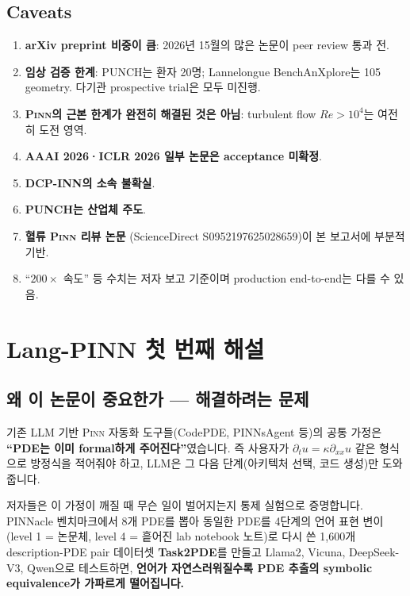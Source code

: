 \documentclass[11pt,a4paper,oneside]{report}
\newcommand{\pinn}{\textsc{Pinn}}
\begin{document}
\section{Caveats}

\begin{warningbox}
\begin{enumerate}
\item \textbf{arXiv preprint 비중이 큼}: 2026년 1\textendash 5월의 많은 논문이 peer review 통과 전.
\item \textbf{임상 검증 한계}: PUNCH는 환자 20명; Lannelongue BenchAnXplore는 105 geometry. 다기관 prospective trial은 모두 미진행.
\item \textbf{\pinn{}의 근본 한계가 완전히 해결된 것은 아님}: turbulent flow $Re > 10^4$는 여전히 도전 영역.
\item \textbf{AAAI 2026·ICLR 2026 일부 논문은 acceptance 미확정}.
\item \textbf{DCP-INN의 소속 불확실}.
\item \textbf{PUNCH는 산업체 주도}.
\item \textbf{혈류 \pinn{} 리뷰 논문} (ScienceDirect S0952197625028659)이 본 보고서에 부분적 기반.
\item ``$200\times$ 속도'' 등 수치는 저자 보고 기준이며 production end-to-end는 다를 수 있음.
\end{enumerate}
\end{warningbox}

\chapter{Lang-PINN 첫 번째 해설}

\section{왜 이 논문이 중요한가 --- 해결하려는 문제}

기존 LLM 기반 \pinn{} 자동화 도구들(CodePDE, PINNsAgent 등)의 공통 가정은 \textbf{``PDE는 이미 formal하게 주어진다''}였습니다. 즉 사용자가 $\partial_t u = \kappa \partial_{xx} u$ 같은 형식으로 방정식을 적어줘야 하고, LLM은 그 다음 단계(아키텍처 선택, 코드 생성)만 도와줍니다.

저자들은 이 가정이 깨질 때 무슨 일이 벌어지는지 통제 실험으로 증명합니다. PINNacle 벤치마크에서 8개 PDE를 뽑아 동일한 PDE를 4단계의 언어 표현 변이(level 1 = 논문체, level 4 = 흩어진 lab notebook 노트)로 다시 쓴 1{,}600개 description-PDE pair 데이터셋 \textbf{Task2PDE}를 만들고 Llama2, Vicuna, DeepSeek-V3, Qwen으로 테스트하면, \textbf{언어가 자연스러워질수록 PDE 추출의 symbolic equivalence가 가파르게 떨어집니다.}
\end{document}
